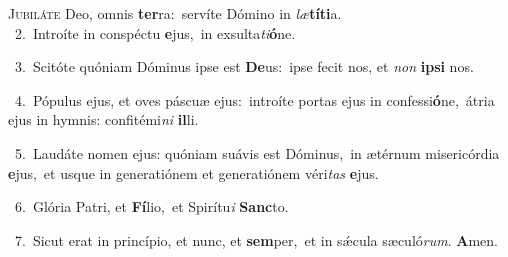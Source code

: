 \lettrine{\initial\textcolor{\initialcolor}{J}}{ubiláte} Deo, omnis \textbf{ter}\-ra:~\star servíte Dómino in \textit{læ}\-\textbf{tí}\textbf{ti}a.\\
{\numbfont\textcolor{\numbcolor}{~2.}}~Introíte in conspéctu \textbf{e}\-jus,~\star in exsulta\-\textit{ti}\-\textbf{ó}ne.\par
{\numbfont\textcolor{\numbcolor}{~3.}}~Scitóte quóniam Dóminus ipse est \textbf{De}\-us:~\star ipse fecit nos, et \textit{non} \textbf{ip}\-\textbf{si} nos.\par
{\numbfont\textcolor{\numbcolor}{~4.}}~Pópulus ejus, et oves páscuæ ejus:~\dagger introíte portas ejus in confessi\-\textbf{ó}\-ne,~\star átria ejus in hymnis: confitémi\textit{ni} \textbf{il}\-li.\par
{\numbfont\textcolor{\numbcolor}{~5.}}~Laudáte nomen ejus: quóniam suávis est Dóminus,~\dagger in ætérnum misericórdia \textbf{e}\-jus,~\star et usque in generatiónem et generatiónem véri\textit{tas} \textbf{e}\-jus.\par
{\numbfont\textcolor{\numbcolor}{~6.}}~Glória Patri, et \textbf{Fí}\-lio,~\star et Spirítu\textit{i} \textbf{Sanc}\-to.\par
{\numbfont\textcolor{\numbcolor}{~7.}}~Sicut erat in princípio, et nunc, et \textbf{sem}\-per,~\star et in sǽcula sæculó\-\textit{rum}\-. \textbf{A}\-men.\par
